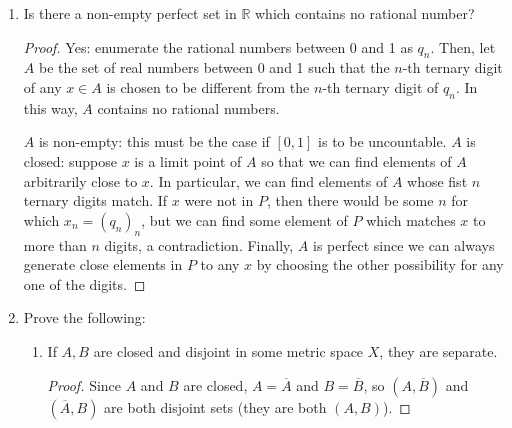 \documentclass{scrbook}
\newcommand{\R}{\mathbb{R}}
\begin{document}
\begin{enumerate}
\begin{proof}
Suppose that $x$ contained a digit other than 4 or 7. That is, suppose $x = 0.x_1 x_2 x_3 \dots x_k\dots$ with $x_k \not\in \{4, 7\}$. Then, choosing a neighbourhood of size $2 \cdot 10^{-(k+1)}$ assures that either $x_k$ or $x_{k+1}$ will not be either a 4 or a 7. Thus, the neighbourhood will contain no elements in $E$. Thus, the contrapositive states that every limit point of $E$ must be in $E$, so $E$ is closed and thus compact.

Let $x \in E'$. We can find elements $x_n$ in $E$ arbitrarily close to $x$ by switching the $n$-th digit between a 4 and a 7, acquiring elements in $E$ which are a distance $3 \cdot 10^{-n}$ from $x$. Thus, $E$ is also perfect.
\end{proof}

\item %
Is there a non-empty perfect set in $\R$ which contains no rational number?

\begin{proof}
Yes: enumerate the rational numbers between 0 and 1 as $q_n$. Then, let $A$ be the set of real numbers between 0 and 1 such that the $n$-th ternary digit of any $x \in A$ is chosen to be different from the $n$-th ternary digit of $q_n$. In this way, $A$ contains no rational numbers.

$A$ is non-empty: this must be the case if $[0, 1]$ is to be uncountable. $A$ is closed: suppose $x$ is a limit point of $A$ so that we can find elements of $A$ arbitrarily close to $x$. In particular, we can find elements of $A$ whose fist $n$ ternary digits match. If $x$ were not in $P$, then there would be some $n$ for which $x_n = (q_n)_n$, but we can find some element of $P$ which matches $x$ to more than $n$ digits, a contradiction. Finally, $A$ is perfect since we can always generate close elements in $P$ to any $x$ by choosing the other possibility for any one of the digits. 
\end{proof}

\item %
Prove the following:
\begin{enumerate}
\item If $A, B$ are closed and disjoint in some metric space $X$, they are separate.

\begin{proof}
Since $A$ and $B$ are closed, $A = \overline{A}$ and $B = \overline{B}$, so $(A, \overline{B})$ and $(\overline{A}, B)$ are both disjoint sets (they are both $(A, B)$).
\end{proof}


\end{enumerate}
\end{enumerate}
\end{document}
